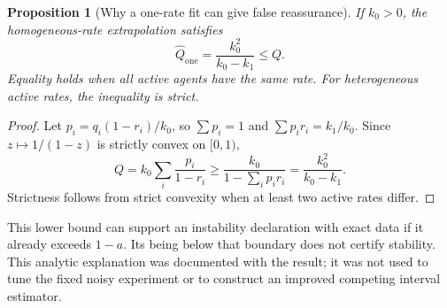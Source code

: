 \documentclass[11pt]{article}
\newtheorem{proposition}[theorem]{Proposition}
\theoremstyle{remark}\newtheorem{remark}[theorem]{Remark}
\begin{document}
\begin{proposition}[Why a one-rate fit can give false reassurance]\label{prop:jensen}
If $k_0>0$, the homogeneous-rate extrapolation satisfies
\begin{equation}
 \widehat Q_{\mathrm{one}}=\frac{k_0^2}{k_0-k_1}\le Q.
\end{equation}
Equality holds when all active agents have the same rate. For heterogeneous active rates, the inequality is strict.
\end{proposition}
\begin{proof}
Let $p_i=q_i(1-r_i)/k_0$, so $\sum p_i=1$ and $\sum p_ir_i=k_1/k_0$. Since $z\mapsto1/(1-z)$ is strictly convex on $[0,1)$,
\begin{equation}
 Q=k_0\sum_i\frac{p_i}{1-r_i}
 \ge\frac{k_0}{1-\sum_i p_ir_i}=\frac{k_0^2}{k_0-k_1}.
\end{equation}
Strictness follows from strict convexity when at least two active rates differ.
\end{proof}
This lower bound can support an instability declaration with exact data if it already exceeds $1-a$. Its being below that boundary does not certify stability. This analytic explanation was documented with the result; it was not used to tune the fixed noisy experiment or to construct an improved competing interval estimator.
\end{document}
